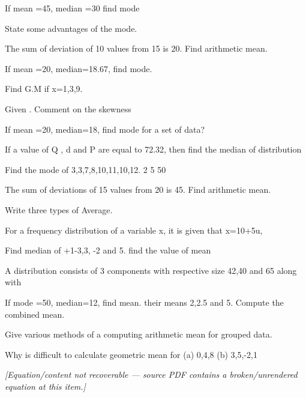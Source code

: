 \documentclass[11pt,a4paper]{article}
\begin{document}
\begin{shortlist}
\item If mean =45, median =30 find mode

\item State some advantages of the mode.

\item The sum of deviation of 10 values from 15 is 20. Find arithmetic mean.

\item If mean =20, median=18.67, find mode.

\item Find G.M if x=1,3,9.

\item Given . Comment on the skewness

\item If mean =20, median=18, find mode for a set of data?

\item If a value of Q , d and P are equal to 72.32, then find the median of distribution

\item Find the mode of 3,3,7,8,10,11,10,12. 2 5 50

\item The sum of deviations of 15 values from 20 is 45. Find arithmetic mean.

\item Write three types of Average.

\item For a frequency distribution of a variable x, it is given that x=10+5u,

\item Find median of +1-3,3, -2 and 5. find the value of mean

\item A distribution consists of 3 components with respective size 42,40 and 65 along with

\item If mode =50, median=12, find mean. their means 2,2.5 and 5. Compute the combined mean.

\item Give various methods of a computing arithmetic mean for grouped data.

\item Why is difficult to calculate geometric mean for (a) 0,4,8 (b) 3,5,-2,1

\item \textit{[Equation/content not recoverable --- source PDF contains a broken/unrendered equation at this item.]}


\end{shortlist}
\end{document}
